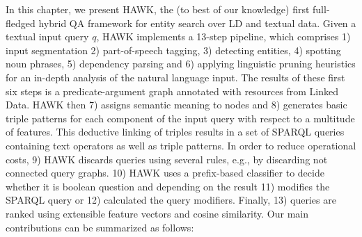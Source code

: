 In this chapter, we present HAWK, the (to best of our knowledge) first full-fledged hybrid \ac{QA} framework for entity search over \ac{LD} and textual data. 
Given a textual input query $q$, HAWK implements a 13-step pipeline, which comprises 1) input segmentation 2) part-of-speech tagging, 3) detecting entities, 4) spotting noun phrases, 5) dependency parsing and 6) applying linguistic pruning heuristics for an in-depth analysis of the natural language input. 
The results of these first six steps is a predicate-argument graph annotated with resources from Linked Data. HAWK then 7) assigns semantic meaning to nodes and 8) generates basic triple patterns for each component of the input query with respect to a multitude of features. 
This deductive linking of triples results in a set of SPARQL queries containing text operators as well as triple patterns.
In order to reduce operational costs, 9) HAWK discards queries using several rules, e.g., by  discarding not connected query graphs.
10) HAWK uses a prefix-based classifier to decide whether it is boolean question and depending on the result 11) modifies the SPARQL query or 12) calculated the query modifiers.
Finally, 13) queries are ranked using extensible feature vectors and cosine similarity.
Our main contributions can be summarized as follows:
